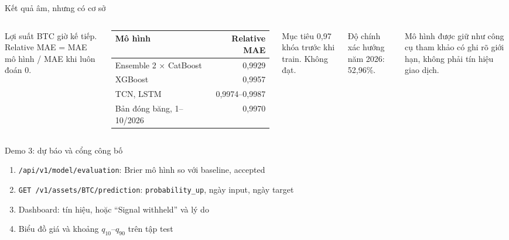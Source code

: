 \documentclass[aspectratio=169,11pt]{beamer}
\newcommand{\sbf}[1]{{\fontseries{sb}\selectfont #1}}
\newcommand{\code}[1]{\texttt{#1}}
\newcommand{\who}{}
\begin{document}
\begin{frame}{Kết quả âm, nhưng có cơ sở}
\begin{columns}[T]
\small
Lợi suất BTC giờ kế tiếp. Relative MAE = MAE mô hình / MAE khi luôn đoán 0.\par\vspace{6pt}
\scriptsize
\begin{tabular}{@{}lr@{}}
\toprule
Mô hình & Relative MAE \\
\midrule
Ensemble 2 × CatBoost & 0,9929 \\
XGBoost & 0,9957 \\
TCN, LSTM & 0,9974--0,9987 \\
Bản đóng băng, 1--10/2026 & 0,9970 \\
\bottomrule
\end{tabular}
\small
Mục tiêu 0,97 khóa trước khi train. \sbf{Không đạt.}\par\vspace{6pt}
Độ chính xác hướng năm 2026: 52,96\%.\par\vspace{6pt}
\color{muted}Mô hình được giữ như công cụ tham khảo có ghi rõ giới hạn, không phải tín hiệu giao dịch.
\end{columns}
\end{frame}

{
\begin{frame}{Demo 3: dự báo và cổng công bố}
\small
\begin{enumerate}
\item \code{/api/v1/model/evaluation}: Brier mô hình so với baseline, accepted
\item \code{GET /v1/assets/BTC/prediction}: \code{probability\_up}, ngày input, ngày target
\item Dashboard: tín hiệu, hoặc ``Signal withheld'' và lý do
\item Biểu đồ giá và khoảng $q_{10}$--$q_{90}$ trên tập test
\end{enumerate}
\end{frame}}

\renewcommand{\who}{Đào Quang Dương}
\end{document}
